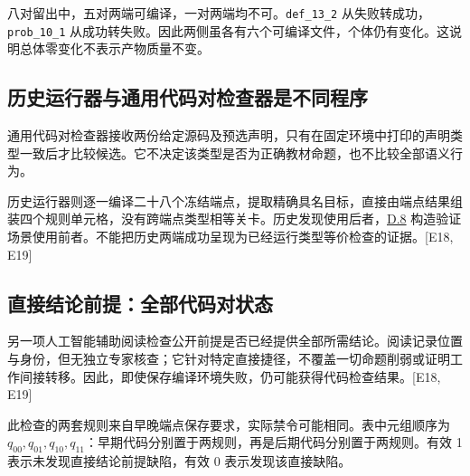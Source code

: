 八对留出中，五对两端可编译，一对两端均不可。\nolinkurl{def_13_2} 从失败转成功，\nolinkurl{prob_10_1} 从成功转失败。因此两侧虽各有六个可编译文件，个体仍有变化。这说明总体零变化不表示产物质量不变。

\subsection[历史运行器与通用代码对检查器是不同程序]{\texorpdfstring{\protect\hypertarget{d3}{}历史运行器与通用代码对检查器是不同程序}{历史运行器与通用代码对检查器是不同程序}}
通用代码对检查器接收两份给定源码及预选声明，只有在固定环境中打印的声明类型一致后才比较候选。它不决定该类型是否为正确教材命题，也不比较全部语义行为。

历史运行器则逐一编译二十八个冻结端点，提取精确具名目标，直接由端点结果组装四个规则单元格，没有跨端点类型相等关卡。历史发现使用后者，\hyperlink{d8}{D.8} 构造验证场景使用前者。不能把历史两端成功呈现为已经运行类型等价检查的证据。[E18, E19]

\subsection[直接结论前提：全部代码对状态]{\texorpdfstring{\protect\hypertarget{d4}{}直接结论前提：全部代码对状态}{直接结论前提：全部代码对状态}}
另一项人工智能辅助阅读检查公开前提是否已经提供全部所需结论。阅读记录位置与身份，但无独立专家核查；它针对特定直接捷径，不覆盖一切命题削弱或证明工作间接转移。因此，即使保存编译环境失败，仍可能获得代码检查结果。[E18, E19]

此检查的两套规则来自早晚端点保存要求，实际禁令可能相同。表中元组顺序为 $q_{00},q_{01},q_{10},q_{11}$：早期代码分别置于两规则，再是后期代码分别置于两规则。有效 1 表示未发现直接结论前提缺陷，有效 0 表示发现该直接缺陷。

